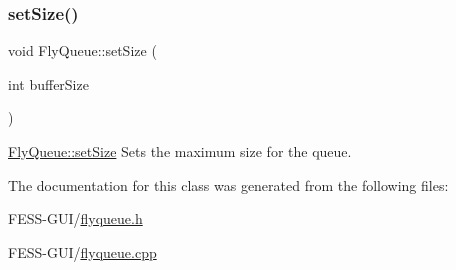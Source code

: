 \hypertarget{class_fly_queue_a5ab4935882579e59c763319b0716ffa1}{}\label{class_fly_queue_a5ab4935882579e59c763319b0716ffa1} 
\subsubsection{\texorpdfstring{set\+Size()}{setSize()}}
{\footnotesize\ttfamily void Fly\+Queue\+::set\+Size (\begin{DoxyParamCaption}\item[{int}]{buffer\+Size }\end{DoxyParamCaption})}



\hyperlink{class_fly_queue_a5ab4935882579e59c763319b0716ffa1}{Fly\+Queue\+::set\+Size} Sets the maximum size for the queue. 



The documentation for this class was generated from the following files\+:\begin{DoxyCompactItemize}
\item 
F\+E\+S\+S-\/\+G\+U\+I/\hyperlink{flyqueue_8h}{flyqueue.\+h}\item 
F\+E\+S\+S-\/\+G\+U\+I/\hyperlink{flyqueue_8cpp}{flyqueue.\+cpp}\end{DoxyCompactItemize}
